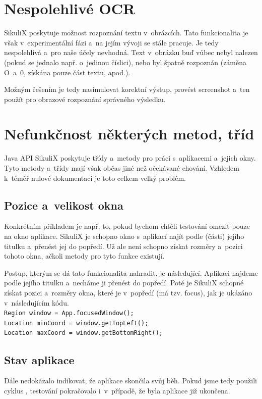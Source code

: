 	\section{Nespolehlivé OCR}
	SikuliX poskytuje možnost rozpoznání textu v~obrázcích. Tato funkcionalita je však v~experimentální fázi a~na jejím vývoji se stále pracuje. Je tedy nespolehlivá a~pro naše účely nevhodná. Text v~obrázku buď vůbec nebyl nalezen (pokud se jednalo např. o~jedinou číslici), nebo byl špatně rozpoznán (záměna O~a~0, získána pouze část textu, apod.).
	
	Možným řešením je tedy nasimulovat korektní výstup, provést screenshot a~ten použít pro obrazové rozpoznání správného výsledku.
	
	\section{Nefunkčnost některých metod, tříd}
	Java API SikuliX poskytuje třídy a~metody pro práci s~aplikacemi a~jejich okny. Tyto metody a~třídy mají však občas jiné než očekávané chování. Vzhledem k~téměř nulové dokumentaci je toto celkem velký problém.

		\subsection{Pozice a~velikost okna}		
		Konkrétním příkladem je např. to, pokud bychom chtěli testování omezit pouze na okno aplikace. SikuliX je schopno okno s~aplikací najít podle (části) jejího titulku a~přenést jej do popředí. Už ale není schopno získat rozměry a~pozici tohoto okna, ačkoli metody pro tyto funkce existují.
	
		Postup, kterým se dá tato funkcionalita nahradit, je následující. Aplikaci najdeme podle jejího titulku a~necháme ji přenést do popředí. Poté je SikuliX schopné získat pozici a~rozměry okna, které je v~popředí (má tzv. focus), jak je ukázáno v~následujícím kódu.\\[0.2cm]
		\texttt{Region window = App.focusedWindow();\\
		Location minCoord = window.getTopLeft();\\
		Location maxCoord = window.getBottomRight();}
		
		\subsection{Stav aplikace}
		Dále nedokázalo indikovat, že aplikace skončila svůj běh. Pokud jsme tedy použili cyklus , testování pokračovalo i~v~případě, že byla aplikace již ukončena.
	

